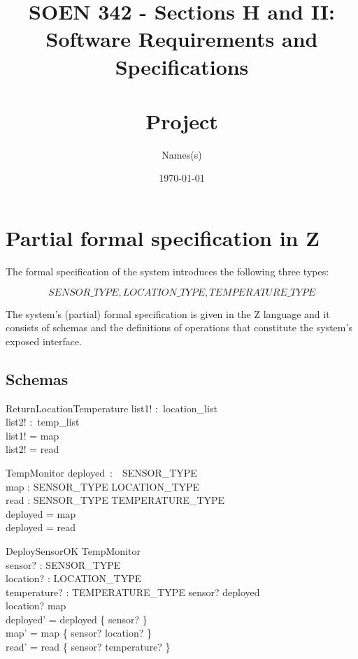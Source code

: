 \documentclass[12pt]{article}
\title{SOEN 342 - Sections H and II:\\Software Requirements and Specifications\\
	\ \\
	Project}
\author{Names(s)}
\date{\today}
\begin{document}
		\maketitle
		
		\newpage

		\section{Partial formal specification in Z}
		
		The formal specification of the system introduces the following three types:
		
		\[ SENSOR\_TYPE, LOCATION\_TYPE, TEMPERATURE\_TYPE  \]
		
		\noindent The system's (partial) formal specification is given in the Z language and it consists of schemas and the definitions of operations that constitute the system's exposed interface.
		
	
		\subsection{Schemas}
		
		
		\begin{schema}{ReturnLocationTemperature}
			list1! :~location\_list\\
			list2! :~temp\_list\\
			\where
			list1! = \ran map\\
			list2! = \ran read
		\end{schema}
		
		\begin{schema}{TempMonitor}
			deployed~:~~SENSOR\_TYPE\\
			map : SENSOR\_TYPE \nrightarrow LOCATION\_TYPE\\
			read : SENSOR\_TYPE  \nrightarrow TEMPERATURE\_TYPE\\
			\where
			deployed = \dom map\\
			deployed = \dom read
		\end{schema}
		
		
		\begin{schema}{DeploySensorOK}
			\Delta TempMonitor\\
			sensor? : SENSOR\_TYPE\\
			location? : LOCATION\_TYPE\\
			temperature? : TEMPERATURE\_TYPE
			\where
			sensor? \notin deployed\\
			location? \notin \ran map\\
			deployed' = deployed \cup \{ sensor? \}\\
			map' = map \cup \{ sensor? \mapsto location? \}\\
			read' = read \cup \{ sensor? \mapsto temperature? \}
		\end{schema}
		
\end{document}
